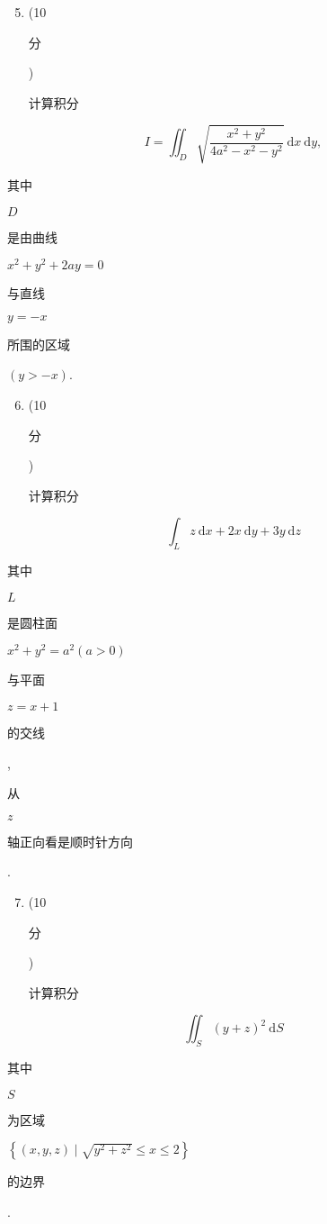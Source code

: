 \documentclass[10pt]{article}
\begin{document}
\begin{enumerate}
  \setcounter{enumi}{4}
  \item (10 \begin{CJK}{UTF8}{mj}分\end{CJK}) \begin{CJK}{UTF8}{mj}计算积分\end{CJK}
\end{enumerate}
$$
I=\iint_{D} \sqrt{\frac{x^{2}+y^{2}}{4 a^{2}-x^{2}-y^{2}}} \mathrm{~d} x \mathrm{~d} y,
$$
\begin{CJK}{UTF8}{mj}其中\end{CJK} $D$ \begin{CJK}{UTF8}{mj}是由曲线\end{CJK} $x^{2}+y^{2}+2 a y=0$ \begin{CJK}{UTF8}{mj}与直线\end{CJK} $y=-x$ \begin{CJK}{UTF8}{mj}所围的区域\end{CJK} $(y>-x)$.

\begin{enumerate}
  \setcounter{enumi}{5}
  \item (10 \begin{CJK}{UTF8}{mj}分\end{CJK}) \begin{CJK}{UTF8}{mj}计算积分\end{CJK}
\end{enumerate}
$$
\int_{L} z \mathrm{~d} x+2 x \mathrm{~d} y+3 y \mathrm{~d} z
$$
\begin{CJK}{UTF8}{mj}其中\end{CJK} $L$ \begin{CJK}{UTF8}{mj}是圆柱面\end{CJK} $x^{2}+y^{2}=a^{2}(a>0)$ \begin{CJK}{UTF8}{mj}与平面\end{CJK} $z=x+1$ \begin{CJK}{UTF8}{mj}的交线\end{CJK}, \begin{CJK}{UTF8}{mj}从\end{CJK} $z$ \begin{CJK}{UTF8}{mj}轴正向看是顺时针方向\end{CJK}.

\begin{enumerate}
  \setcounter{enumi}{6}
  \item (10 \begin{CJK}{UTF8}{mj}分\end{CJK}) \begin{CJK}{UTF8}{mj}计算积分\end{CJK}
\end{enumerate}
$$
\iint_{S}(y+z)^{2} \mathrm{~d} S
$$
\begin{CJK}{UTF8}{mj}其中\end{CJK} $S$ \begin{CJK}{UTF8}{mj}为区域\end{CJK} $\left\{(x, y, z) \mid \sqrt{y^{2}+z^{2}} \leq x \leq 2\right\}$ \begin{CJK}{UTF8}{mj}的边界\end{CJK}.
\end{document}

